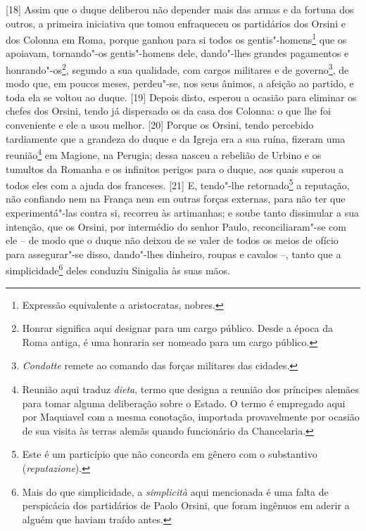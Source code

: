 {[}18{]} Assim que o duque deliberou não depender mais das armas e da
fortuna dos outros, a primeira iniciativa que tomou enfraqueceu os
partidários dos Orsini e dos Colonna em Roma, porque ganhou para si
todos os gentis"-homens\footnote{Expressão equivalente a aristocratas,
  nobres.} que os apoiavam, tornando"-os gentis"-homens dele, dando"-lhes
grandes pagamentos e honrando"-os\footnote{Honrar significa aqui designar
  para um cargo público. Desde a época da Roma antiga, é uma honraria
  ser nomeado para um cargo público.}, segundo a sua qualidade, com
cargos militares e de governo\footnote{\emph{Condotte} remete ao comando
  das forças militares das cidades.}, de modo que, em poucos meses,
perdeu"-se, nos seus ânimos, a afeição ao partido, e toda ela se voltou
ao duque. {[}19{]} Depois disto, esperou a ocasião para eliminar os
chefes dos Orsini, tendo já dispersado os da casa dos Colonna: o que lhe
foi conveniente e ele a usou melhor. {[}20{]} Porque os Orsini, tendo
percebido tardiamente que a grandeza do duque e da Igreja era a sua
ruína, fizeram uma reunião\footnote{Reunião aqui traduz \emph{dieta},
  termo que designa a reunião dos príncipes alemães para tomar alguma
  deliberação sobre o Estado. O termo é empregado aqui por Maquiavel com
  a mesma conotação, importada provavelmente por ocasião de sua visita
  às terras alemãs quando funcionário da Chancelaria.} em Magione, na
Perugia; dessa nasceu a rebelião de Urbino e os tumultos da Romanha e os
infinitos perigos para o duque, aos quais superou a todos eles com a
ajuda dos franceses. {[}21{]} E, tendo"-lhe retornado\footnote{Este é um
  particípio que não concorda em gênero com o substantivo
  (\emph{reputazione}).} a reputação, não confiando nem na França nem em
outras forças externas, para não ter que experimentá"-las contra si,
recorreu às artimanhas; e soube tanto dissimular a sua intenção, que os
Orsini, por intermédio do senhor Paulo, reconciliaram"-se com ele -- de
modo que o duque não deixou de se valer de todos os meios de ofício para
assegurar"-se disso, dando"-lhes dinheiro, roupas e cavalos --, tanto que
a simplicidade\footnote{Mais do que simplicidade, a \emph{simplicità}
  aqui mencionada é uma falta de perspicácia dos partidários de Paolo
  Orsini, que foram ingênuos em aderir a alguém que haviam traído antes.}
deles conduziu Sinigalia às suas mãos.

